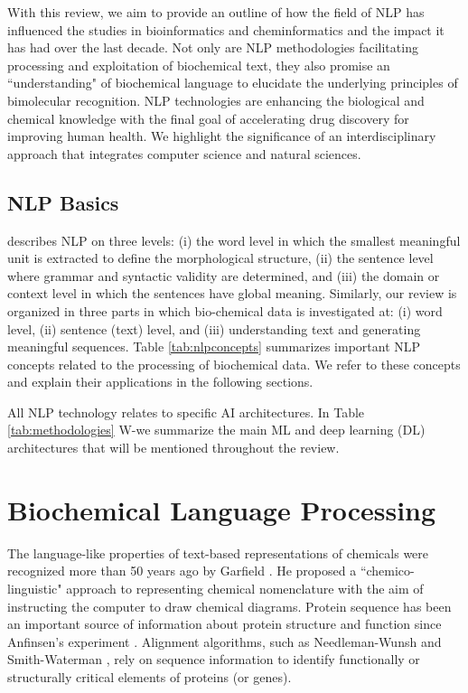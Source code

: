 \documentclass[review]{elsarticle}
\begin{document}
With this review, we aim to provide an outline of how the field of NLP has influenced the studies in bioinformatics and cheminformatics and the impact it has had over the last decade. Not only are NLP methodologies facilitating processing and exploitation of biochemical text, they also promise an ``understanding" of biochemical language to elucidate the underlying principles of bimolecular recognition. NLP technologies are enhancing the biological and chemical knowledge with the final goal of accelerating drug discovery for improving human health. We highlight the significance of an interdisciplinary approach that integrates computer science and natural sciences.  


\subsection{NLP Basics}
\citet{chowdhury2003natural} describes NLP on three levels: (i) the word level in which the smallest meaningful unit is extracted to define the morphological structure, (ii) the sentence  level where grammar and syntactic validity are determined, and (iii) the domain or context level in which the sentences have global meaning. Similarly, our review is organized in three parts in which bio-chemical data is investigated at: (i) word level, (ii) sentence (text) level, and (iii) understanding text and generating meaningful sequences. Table \ref{tab:nlpconcepts} summarizes important NLP concepts related to the processing of biochemical data. We refer to these concepts and explain their applications in the following sections. 


All NLP technology relates to specific AI architectures. In Table \ref{tab:methodologies} W-we summarize the main ML and deep learning (DL) architectures that will be mentioned throughout the review. 


\section{Biochemical Language Processing} \label{section:NLP4BioChem}

The language-like properties of text-based representations of chemicals were recognized more than 50 years ago by Garfield \cite{garfield1961chemico}. He proposed a ``chemico-linguistic" approach to representing chemical nomenclature with the aim of instructing the computer to draw chemical diagrams. Protein sequence has been an important source of information about protein structure and function since Anfinsen's experiment \cite{anfinsen1973principles}. Alignment algorithms, such as Needleman-Wunsh  \cite{needleman1970general} and Smith-Waterman \cite{smith1981identification}, rely on sequence information to identify functionally or structurally critical elements of proteins (or genes). 
\end{document}
